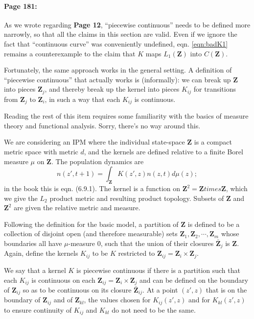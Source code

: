 \documentclass[12pt]{article}
\numberwithin{Box}{section}
\def\Z{\mathbf{Z}}
\newcommand{\be}{\begin{equation}}
\newcommand{\ee}{\end{equation}}
\begin{document}
\paragraph{Page 181:} As we wrote regarding \textbf{Page 12}, ``piecewise continuous'' needs 
to be defined more narrowly, so that all the claims in this section are valid. 
Even if we ignore the fact that ``continuous curve'' was conveniently undefined, 
eqn. \eqref{eqn:badK1} remains a counterexample to the claim that $K$ maps $L_1(\Z)$ into $C(\Z)$. 

Fortunately, the same approach works in the general setting. A definition of ``piecewise continuous''
that actually works is (informally): we can break up $\Z$ into pieces $\Z_j$, and thereby break up the kernel into
pieces $K_{ij}$ for transitions from $\Z_j$ to $\Z_i$, in such a way that each $K_{ij}$ is continuous. 

Reading the rest of this item requires some familiarity with the basics of measure theory 
and functional analysis. Sorry, there's no way around this. 

We are considering an IPM where the individual state-space $\Z$ is a compact metric space with metric $d$, 
and the kernels are defined relative to a finite Borel measure $\mu$ on $\Z$. 
The population dynamics are 
\be
n(z',t+1) = \int_{\Z} K(z',z)n(z,t) d\mu(z);
\ee 
in the book this is eqn. (6.9.1). The kernel is a function on $\Z^2 = \Z times \Z$, which we give the
$L_2$ product metric and resulting product topology. Subsets of $\Z$ and $\Z^2$ are given the relative
metric and measure. 

Following the definition for the basic model, a partition of $\Z$ is defined to be a collection of disjoint 
open (and therefore measurable) sets $\Z_1, \Z_2, \cdots, \Z_m $ whose boundaries all have $\mu$-measure 0, 
such that the union of their closures $\bar{\Z}_j$ is $\Z$. Again, define the kernels $K_{ij}$ to be $K$ 
restricted to $\Z_{ij} = \Z_i \times \Z_j$. 

We say that a kernel $K$ is piecewise continuous if there is a partition such that each $K_{ij}$ is 
continuous on each $\Z_{ij} = \Z_i \times \Z_j$ and can be defined on the boundary 
of $\Z_{ij}$ so as to be continuous on its closure $\bar{\Z}_{ij}$. At a point $(z',z)$ that is on the boundary
of $\Z_{ij}$ and of $\Z_{kl}$, the values chosen for $K_{ij}(z',z)$ and for $K_{kl}(z',z)$ to ensure continuity
of $K_{ij}$ and $K_{kl}$ do not need to be the same.  
\end{document}
